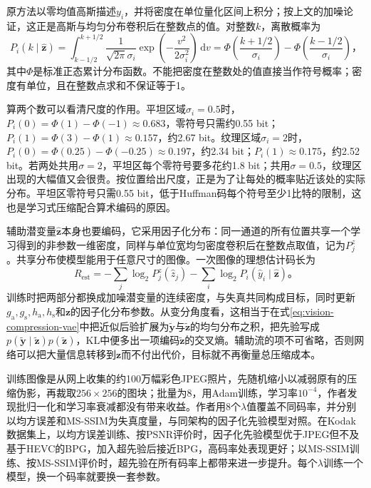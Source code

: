 原方法以零均值高斯描述$y_i$，并将密度在单位量化区间上积分；按上文的加噪论证，这正是高斯与均匀分布卷积后在整数点的值。对整数$k$，离散概率为
\begin{equation}
 P_i(k\mid\hat{\bm{z}})
 =\int_{k-1/2}^{k+1/2}
   \frac{1}{\sqrt{2\pi}\sigma_i}
   \exp\!\left(-\frac{v^2}{2\sigma_i^2}\right)\,\mathrm{d}v
 =\Phi\!\left(\frac{k+1/2}{\sigma_i}\right)
  -\Phi\!\left(\frac{k-1/2}{\sigma_i}\right)\text{，}
 \label{eq:vision-hyperprior-probability}
\end{equation}
其中$\Phi$是标准正态累计分布函数。不能把密度在整数处的值直接当作符号概率；密度有单位，且在整数点求和不保证等于1。

算两个数可以看清尺度的作用。平坦区域$\sigma_i=0.5$时，$P_i(0)=\Phi(1)-\Phi(-1)\approx0.683$，零符号只需约0.55 bit；$P_i(1)=\Phi(3)-\Phi(1)\approx0.157$，约2.67 bit。纹理区域$\sigma_i=2$时，$P_i(0)=\Phi(0.25)-\Phi(-0.25)\approx0.197$，约2.34 bit；$P_i(1)\approx0.175$，约2.52 bit。若两处共用$\sigma=2$，平坦区每个零符号要多花约1.8 bit；共用$\sigma=0.5$，纹理区出现的大幅值又会很贵。按位置给出尺度，正是为了让每处的概率贴近该处的实际分布。平坦区零符号只需0.55 bit，低于Huffman码每个符号至少1比特的限制，这也是学习式压缩配合算术编码的原因。

辅助潜变量$\hat{\bm{z}}$本身也要编码，它采用因子化分布：同一通道的所有位置共享一个学习得到的非参数一维密度，同样与单位宽均匀密度卷积后在整数点取值，记为$P_j^{z}$。共享分布使模型能用于任意尺寸的图像。一次图像的理想估计码长为
\begin{equation}
 R_{\mathrm{est}}=
 -\sum_j\log_2 P_j^{z}(\hat z_j)
 -\sum_i\log_2 P_i(\hat y_i\mid\hat{\bm{z}})\text{。}
 \label{eq:vision-hyperprior-rate}
\end{equation}
训练时把两部分都换成加噪潜变量的连续密度，与失真共同构成目标，同时更新$g_{\mathrm{a}},g_{\mathrm{s}},h_{\mathrm{a}},h_{\mathrm{s}}$和$\bm{z}$的因子化分布参数。从变分角度看，这相当于在式\eqref{eq:vision-compression-vae}中把近似后验扩展为$\tilde{\bm{y}}$与$\tilde{\bm{z}}$的均匀分布之积，把先验写成$p(\tilde{\bm{y}}\mid\tilde{\bm{z}})p(\tilde{\bm{z}})$，KL中便多出一项编码$\tilde{\bm{z}}$的交叉熵。辅助流的项不可省略，否则网络可以把大量信息转移到$\bm{z}$而不付出代价，目标就不再衡量总压缩成本。

训练图像是从网上收集的约100万幅彩色JPEG照片，先随机缩小以减弱原有的压缩伪影，再裁取$256\times256$的图块；批量为8，用Adam训练，学习率$10^{-4}$，作者发现批归一化和学习率衰减都没有带来收益。作者用8个$\lambda$值覆盖不同码率，并分别以均方误差和MS-SSIM为失真度量，与同架构的因子化先验模型对照。在Kodak数据集上，以均方误差训练、按PSNR评价时，因子化先验模型优于JPEG但不及基于HEVC的BPG，加入超先验后接近BPG，高码率处表现更好；以MS-SSIM训练、按MS-SSIM评价时，超先验在所有码率上都带来进一步提升。每个$\lambda$训练一个模型，换一个码率就要换一套参数。

